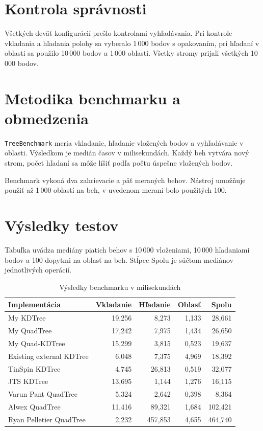 \documentclass[12pt,a4paper,oneside]{report}
\begin{document}
\section{Kontrola správnosti}
Všetkých deväť konfigurácií prešlo kontrolami vyhľadávania.
Pri kontrole vkladania a hľadania polohy sa vyberalo
1\,000 bodov s opakovaním, pri hľadaní v oblasti sa použilo 10\,000
bodov a 1\,000 oblastí. Všetky stromy prijali všetkých 10\,000 bodov.

\section{Metodika benchmarku a obmedzenia}
\texttt{TreeBenchmark} meria vkladanie, hľadanie vložených bodov
a vyhľadávanie v oblasti. Výsledkom je medián časov v milisekundách.
Každý beh vytvára nový strom, počet hľadaní sa môže líšiť podľa počtu
úspešne vložených bodov.

Benchmark vykoná dva zahrievacie a päť meraných behov. Nástroj umožňuje
použiť až 1\,000 oblastí na beh, v uvedenom meraní bolo použitých 100.

\section{Výsledky testov}
Tabuľka uvádza mediány piatich behov s 10\,000 vloženiami,
10\,000 hľadaniami bodov a 100 dopytmi na oblasť na beh.
Stĺpec Spolu je súčtom mediánov jednotlivých operácií.

\begin{table}[H]
\centering
\small
\begin{tabularx}{\textwidth}{@{}Xrrrr@{}}
\toprule
\textbf{Implementácia} & \textbf{Vkladanie} & \textbf{Hľadanie} &
\textbf{Oblasť} & \textbf{Spolu}\\
\midrule
My KDTree & 19,256 & 8,273 & 1,133 & 28,661\\
My QuadTree & 17,242 & 7,975 & 1,434 & 26,650\\
My Quad-KDTree & 15,299 & 3,815 & 0,523 & 19,637\\
Existing external KDTree & 6,048 & 7,375 & 4,969 & 18,392\\
TinSpin KDTree & 4,745 & 26,813 & 0,519 & 32,077\\
JTS KDTree & 13,695 & 1,144 & 1,276 & 16,115\\
Varun Pant QuadTree & 5,324 & 2,642 & 0,398 & 8,364\\
Alwex QuadTree & 11,416 & 89,321 & 1,684 & 102,421\\
Ryan Pelletier QuadTree & 2,232 & 457,853 & 4,655 & 464,740\\
\bottomrule
\end{tabularx}
\caption{Výsledky benchmarku v milisekundách}
\label{tab:benchmark-results}
\end{table}
\end{document}

